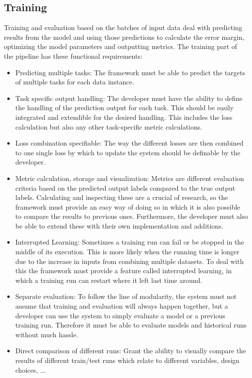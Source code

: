 \subsection{Training}

Training and evaluation based on the batches of input data deal with predicting results from the model and using those predictions to calculate the error margin, optimizing the model parameters and outputting metrics. The training part of the pipeline has these functional requirements:

\begin{itemize}

	\item Predicting multiple tasks: The framework must be able to predict the targets of multiple tasks for each data instance. 
	\item Task specific output handling: The developer must have the ability to define the handling of the prediction output for each task. This should be easily integrated and extendible for the desired handling. This includes the loss calculation but also any other task-specific metric calculations.
	\item Loss combination specifiable: The way the different losses are then combined to one single loss by which to update the system should be definable by the developer.
	\item Metric calculation, storage and visualization: Metrics are different evaluation criteria based on the predicted output labels compared to the true output labels. Calculating and inspecting these are a crucial of research, so the framework must provide an easy way of doing so in which it is also possible to compare the results to previous ones. Furthermore, the developer must also be able to extend these with their own implementation and additions.
	\item Interrupted Learning: Sometimes a training run can fail or be stopped in the middle of its execution. This is more likely when the running time is longer due to the increase in inputs from combining multiple datasets. To deal with this the framework must provide a feature called interrupted learning, in which a training run can restart where it left last time around.
	\item Separate evaluation: To follow the line of modularity, the system must not assume that training and evaluation will always happen together, but a developer can use the system to simply evaluate a model or a previous training run. Therefore it must be able to evaluate models and historical runs without much hassle.
	\item Direct comparison of different runs: Grant the ability to visually compare the results of different train/test runs which relate to different variables, design choices, ...
\end{itemize}

